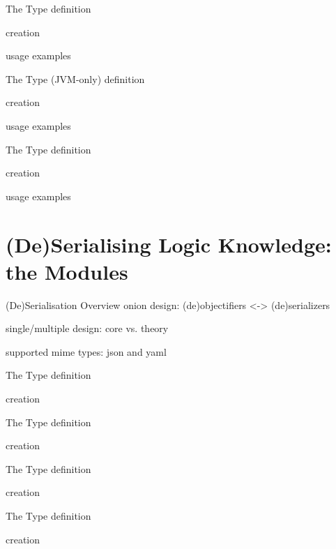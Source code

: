 \documentclass[handout]{beamer}
\begin{document}
\begin{frame}[allowframebreaks]{The  Type}
    definition

    creation

    usage examples
\end{frame}

\begin{frame}[allowframebreaks]{The  Type (JVM-only)}
    definition

    creation

    usage examples
\end{frame}

\begin{frame}[allowframebreaks]{The  Type}
    definition

    creation

    usage examples
\end{frame}

\section{(De)Serialising Logic Knowledge: the  Modules}

\begin{frame}[allowframebreaks]{(De)Serialisation Overview}
    onion design: (de)objectifiers <-> (de)serializers

    single/multiple design: core vs. theory

    supported mime types: json and yaml
\end{frame}

\begin{frame}[allowframebreaks]{The  Type}
    definition

    creation
\end{frame}

\begin{frame}[allowframebreaks]{The  Type}
    definition

    creation
\end{frame}

\begin{frame}[allowframebreaks]{The  Type}
    definition

    creation
\end{frame}

\begin{frame}[allowframebreaks]{The  Type}
    definition

    creation
\end{frame}
\end{document}
